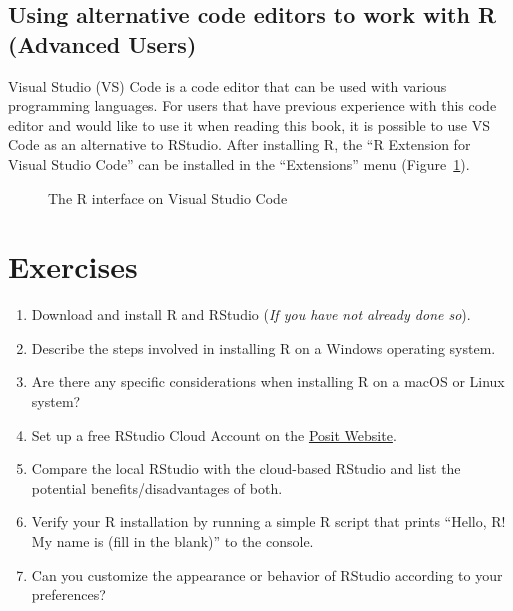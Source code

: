 \documentclass[
  letterpaper,
  DIV=11,
  numbers=noendperiod]{scrreprt}
\providecommand{\tightlist}{%
  \setlength{\itemsep}{0pt}\setlength{\parskip}{0pt}}\usepackage{longtable,booktabs,array}
\begin{document}
\subsection{Using alternative code editors to work with R (Advanced
Users)}\label{using-alternative-code-editors-to-work-with-r-advanced-users}

Visual Studio (VS) Code is a code editor that can be used with various
programming languages. For users that have previous experience with this
code editor and would like to use it when reading this book, it is
possible to use VS Code as an alternative to RStudio. After installing
R, the ``R Extension for Visual Studio Code'' can be installed in the
``Extensions'' menu (Figure~\ref{fig-r-vscode}).

\begin{figure}


\caption{\label{fig-r-vscode}The R interface on Visual Studio Code}

\end{figure}%

\section{Exercises}\label{exercises-1}

\begin{enumerate}
\def\labelenumi{\roman{enumi}.}
\tightlist
\item
  Download and install R and RStudio (\emph{If you have not already done
  so}).
\item
  Describe the steps involved in installing R on a Windows operating
  system.
\item
  Are there any specific considerations when installing R on a macOS or
  Linux system?
\item
  Set up a free RStudio Cloud Account on the
  \href{https://posit.cloud/}{Posit Website}.
\item
  Compare the local RStudio with the cloud-based RStudio and list the
  potential benefits/disadvantages of both.
\item
  Verify your R installation by running a simple R script that prints
  ``Hello, R! My name is (fill in the blank)'' to the console.
\item
  Can you customize the appearance or behavior of RStudio according to
  your preferences?
\end{enumerate}
\end{document}
